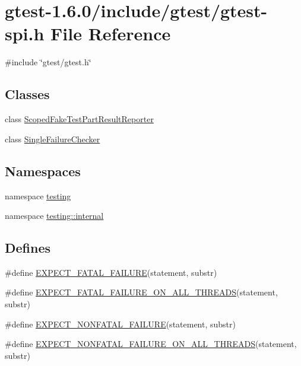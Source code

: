 \hypertarget{gtest-spi_8h}{\section{gtest-\/1.6.0/include/gtest/gtest-\/spi.h \-File \-Reference}
\label{dc/dbe/gtest-spi_8h}
}
{\ttfamily \#include \char`\"{}gtest/gtest.\-h\char`\"{}}\*
\subsection*{\-Classes}
\begin{DoxyCompactItemize}
\item 
class \hyperlink{classtesting_1_1ScopedFakeTestPartResultReporter}{\-Scoped\-Fake\-Test\-Part\-Result\-Reporter}
\item 
class \hyperlink{classtesting_1_1internal_1_1SingleFailureChecker}{\-Single\-Failure\-Checker}
\end{DoxyCompactItemize}
\subsection*{\-Namespaces}
\begin{DoxyCompactItemize}
\item 
namespace \hyperlink{namespacetesting}{testing}
\item 
namespace \hyperlink{namespacetesting_1_1internal}{testing\-::internal}
\end{DoxyCompactItemize}
\subsection*{\-Defines}
\begin{DoxyCompactItemize}
\item 
\#define \hyperlink{gtest-spi_8h_a819a3fd7f8b8cf24b6f1b3a26708973d}{\-E\-X\-P\-E\-C\-T\-\_\-\-F\-A\-T\-A\-L\-\_\-\-F\-A\-I\-L\-U\-R\-E}(statement, substr)
\item 
\#define \hyperlink{gtest-spi_8h_ad8aac5bc859b2ddc07583636ae4f45cf}{\-E\-X\-P\-E\-C\-T\-\_\-\-F\-A\-T\-A\-L\-\_\-\-F\-A\-I\-L\-U\-R\-E\-\_\-\-O\-N\-\_\-\-A\-L\-L\-\_\-\-T\-H\-R\-E\-A\-D\-S}(statement, substr)
\item 
\#define \hyperlink{gtest-spi_8h_a8376fd6821bd88fd806697355e79e138}{\-E\-X\-P\-E\-C\-T\-\_\-\-N\-O\-N\-F\-A\-T\-A\-L\-\_\-\-F\-A\-I\-L\-U\-R\-E}(statement, substr)
\item 
\#define \hyperlink{gtest-spi_8h_a9f4cf1f150fe9facfc4cbf0bae646ee9}{\-E\-X\-P\-E\-C\-T\-\_\-\-N\-O\-N\-F\-A\-T\-A\-L\-\_\-\-F\-A\-I\-L\-U\-R\-E\-\_\-\-O\-N\-\_\-\-A\-L\-L\-\_\-\-T\-H\-R\-E\-A\-D\-S}(statement, substr)
\end{DoxyCompactItemize}


